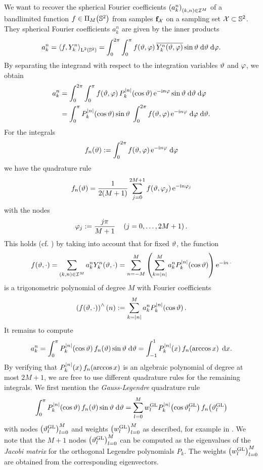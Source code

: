 We want to recover the spherical Fourier coefficients $\left(a_{k}^n\right)_{(k,n) \in \mathcal{I}^M}$ of a bandlimited function $f \in \Pi_{M}{\hspace{-0.4ex}}\left(\mathbb{S}^2\right)$
from samples $\mathbf{f}_{\mathcal{X}}$ on a sampling set $\mathcal{X} \subset \mathbb{S}^2$. 
They spherical Fourier coefficients $a_{k}^n$ are given by the inner products
\[
  a_{k}^n = \left<f,Y_{k}^n\right>_{\text{\rm{L}}^{2}\left(\mathbb{S}^2\right)} = \int_{0}^{2\pi} \int_{0}^{\pi} 
  f{\hspace{-0.4ex}}\left(\vartheta,\varphi\right) \overline{Y_{k}^n{\hspace{-0.4ex}}\left(\vartheta,\varphi\right)} \sin \vartheta 
  \; \text{\rm{d}} \vartheta \; \text{\rm{d}} \varphi.
\]
By separating the integrand with respect to the integration variables $\vartheta$ and $\varphi$, we obtain
\begin{align*}
  a_{k}^n & = \int_{0}^{2\pi} \int_{0}^{\pi} f{\hspace{-0.4ex}}\left(\vartheta,\varphi\right) P_{k}^{\left\vert n\right\vert}{\hspace{-0.4ex}}\left(\cos \vartheta\right) \mbox{\rm{e}}^{-\mbox{\scriptsize\rm{i}} n \varphi} \sin \vartheta \; \text{\rm{d}} \vartheta \; \text{\rm{d}} \varphi\\
          & = \int_{0}^{\pi} P_{k}^{\left\vert n\right\vert}{\hspace{-0.4ex}}\left(\cos \vartheta\right) \sin \vartheta \; \int_{0}^{2\pi} f{\hspace{-0.4ex}}\left(\vartheta,\varphi\right) \mbox{\rm{e}}^{-\mbox{\scriptsize\rm{i}} n \varphi} \; \text{\rm{d}} \varphi \; \text{\rm{d}} \vartheta.
\end{align*}
For the integrals
\[
  f_{n}{\hspace{-0.4ex}}\left(\vartheta\right) := \int_{0}^{2\pi} f{\hspace{-0.4ex}}\left(\vartheta,\varphi\right) \mbox{\rm{e}}^{-\mbox{\scriptsize\rm{i}} n \varphi} \; \text{\rm{d}} \varphi
\]
we have the quadrature rule
\[ 
  f_{n}{\hspace{-0.4ex}}\left(\vartheta\right) = \frac{1}{2(M+1)} \sum_{j=0}^{2M+1} f{\hspace{-0.4ex}}\left(\vartheta,\varphi_{j}\right) \mbox{\rm{e}}^{-\mbox{\scriptsize\rm{i}} n \varphi_{j}}
\]
with the nodes
\[ 
  \varphi_{j} := \frac{j\pi}{M+1} \quad \left(j=0,\ldots,2M+1\right). 
\]
This holds (cf. \cite[Chapter X]{Zy}) by taking into account that for fixed $\vartheta$, the function
\[
  f{\hspace{-0.4ex}}\left(\vartheta,\cdot\right) = \sum_{(k,n) \in \mathcal{I}^M} a_{k}^n
  Y_{k}^n{\hspace{-0.4ex}}\left(\vartheta,\cdot\right) = \sum_{n=-M}^{M} 
  \left(\sum_{k=\left\vert n\right\vert}^M a_{k}^n 
  P_{k}^{\left\vert n\right\vert}{\hspace{-0.4ex}}\left(\cos \vartheta\right)\right) \mbox{\rm{e}}^{-\mbox{\scriptsize\rm{i}} n \: \cdot}
\]
is a trigonometric polynomial of degree $M$ with Fourier coefficients
\[
  \left(f{\hspace{-0.4ex}}\left(\vartheta,\cdot\right)\right)^{\wedge}{\hspace{-0.4ex}}\left(n\right) := \sum_{k=\left\vert n\right\vert}^M a_{k}^n P_{k}^{\left\vert n\right\vert}{\hspace{-0.4ex}}\left(\cos \vartheta\right).
\]
It remains to compute
\[
  a_{k}^n = \int_{0}^{\pi} P_{k}^{\left\vert n\right\vert}{\hspace{-0.4ex}}\left(\cos \vartheta\right) f_{n}{\hspace{-0.4ex}}\left(\vartheta\right) \sin \vartheta \; \text{\rm{d}} \vartheta = 
  \int_{-1}^1 P_{k}^{\left\vert n\right\vert}{\hspace{-0.4ex}}\left(x\right) f_{n}{\hspace{-0.4ex}}\left(\arccos x\right) \; \text{\rm{d}} x.
\]
By verifying that $P_{k}^{\left\vert n\right\vert}{\hspace{-0.4ex}}\left(x\right) f_{n}{\hspace{-0.4ex}}\left(\arccos x\right)$ is an algebraic polynomial of degree at most $2M+1$, 
we are free to use different quadrature rules for the remaining integrals. We 
first mention the \emph{Gauss-Legendre} quadrature rule
\[
  \int_{0}^{\pi} P_{k}^{\left\vert n\right\vert}{\hspace{-0.4ex}}\left(\cos \vartheta\right) f_{n}{\hspace{-0.4ex}}\left(\vartheta\right) \sin \vartheta \; \text{\rm{d}} \vartheta = \sum_{l=0}^{M} w_{l}^{\mbox{\scriptsize\rm{GL}}} P_{k}^{\left\vert n\right\vert}{\hspace{-0.4ex}}\left(\cos \vartheta_{l}^{\mbox{\scriptsize\rm{GL}}}\right) f_{n}{\hspace{-0.4ex}}\left(\vartheta_{l}^{\mbox{\scriptsize\rm{GL}}}\right) 
\]
with nodes $\left(\vartheta_{l}^{\mbox{\scriptsize\rm{GL}}}\right)_{l=0}^M$ and weights $\left(w_{l}^{\mbox{\scriptsize\rm{GL}}}\right)_{l=0}^M$ as described, for example in \cite{boehme02}. 
We note that the $M+1$ nodes $\left(\vartheta_{l}^{\mbox{\scriptsize\rm{GL}}}\right)_{l=0}^{M}$ can be computed as the eigenvalues of the \emph{Jacobi matrix} for the orthogonal 
Legendre polynomials $P_{k}$. The weights $\left(w_{l}^{\mbox{\scriptsize\rm{GL}}}\right)_{l=0}^{M}$ are obtained from the corresponding eigenvectors.

